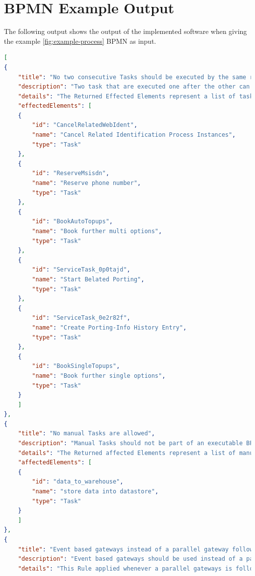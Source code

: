 \section{BPMN Example Output}\label{app-output}
The following output shows the output of the implemented software when giving the example \ref{fig:example-process} BPMN as input.
\begin{lstlisting}[breaklines=true, language=json]
[
{
	"title": "No two consecutive Tasks should be executed by the same resource",
	"description": "Two task that are executed one after the other can be merged if they have the same enitity executing the Task. In case of User tasks this means the same usergroup is executing this task. Automated Tasks that follow each other should also always be merged to minimize flownodes.",
	"details": "The Returned Effected Elements represent a list of tasks that can be merged with its direct successor.In case that three or more tasks can be merged, this algorithm will return every Task that can be mergedwith its successor on its own. Therefore if \"task1\" , \"task2\" and \"task3\" can be merged all together, this algorithm will \"task2\" and \"task3\" as effected elements",
	"effectedElements": [
	{
		"id": "CancelRelatedWebIdent",
		"name": "Cancel Related Identification Process Instances",
		"type": "Task"
	},
	{
		"id": "ReserveMsisdn",
		"name": "Reserve phone number",
		"type": "Task"
	},
	{
		"id": "BookAutoTopups",
		"name": "Book further multi options",
		"type": "Task"
	},
	{
		"id": "ServiceTask_0p0tajd",
		"name": "Start Belated Porting",
		"type": "Task"
	},
	{
		"id": "ServiceTask_0e2r82f",
		"name": "Create Porting-Info History Entry",
		"type": "Task"
	},
	{
		"id": "BookSingleTopups",
		"name": "Book further single options",
		"type": "Task"
	}
	]
},
{
	"title": "No manual Tasks are allowed",
	"description": "Manual Tasks should not be part of an executable BPMN diagram",
	"details": "The Returned affected Elements represent a list of manual tasks in the given diagram",
	"affectedElements": [
	{
		"id": "data_to_warehouse",
		"name": "store data into datastore",
		"type": "Task"
	}
	]
},
{
	"title": "Event based gateways instead of a parallel gateway followed by exclusive gateways",
	"description": "Event based gateways should be used instead of a parallel gateway followed by one or more exclusive gateways",
	"details": "This Rule applied whenever a parallel gateways is followed by one or more exclusive gateways. The returned affected Elements are a list of parallel gateways that are followed by one or more exclusive gateways in the given diagram",

\end{lstlisting}
